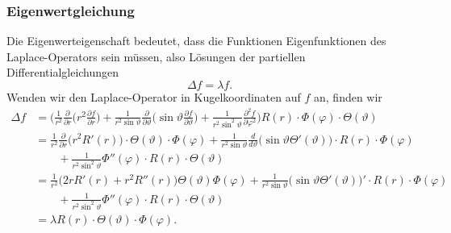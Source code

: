 \subsubsection{Eigenwertgleichung}
Die Eigenwerteigenschaft bedeutet, dass die Funktionen Eigenfunktionen
des Laplace-Operators sein müssen, also Lösungen der partiellen
Differentialgleichungen
\[
\Delta f = \lambda f.
\]
Wenden wir den Laplace-Operator in Kugelkoordinaten auf $f$ an, finden
wir
\begin{align*}
\Delta f
&=
\biggl(
\frac{1}{r^2} \frac{\partial}{\partial r}
\biggl(r^2\frac{\partial f}{\partial r}\biggr)
+
\frac1{r^2\sin\vartheta}\frac{\partial}{\partial\vartheta}
\biggl(\sin\vartheta\frac{\partial f}{\partial\vartheta}\biggr)
+
\frac1{r^2\sin^2\vartheta}\frac{\partial^2 f}{\partial\varphi^2}
\biggr)
R(r)\cdot \Phi(\varphi)\cdot \Theta(\vartheta)
\\
&=
\frac1{r^2}\frac{\partial}{\partial r}\bigl(r^2R'(r)\bigr)
\cdot \Theta(\vartheta)\cdot \Phi(\varphi)
+
\frac1{r^2\sin\vartheta}\frac{d}{d\vartheta}
\bigl(\sin\vartheta \Theta'(\vartheta)\bigr)
\cdot R(r)\cdot \Phi(\varphi)
\\
&\qquad
+
\frac1{r^2\sin^2\vartheta}\Phi''(\varphi)
\cdot R(r)\cdot \Theta(\vartheta)
\\
&=
\frac1{r^2}\bigl(2rR'(r)+r^2R''(r)\bigr)
\Theta(\vartheta)\Phi(\varphi)
+
\frac1{r^2\sin\vartheta}
\bigl(\sin\vartheta\Theta'(\vartheta)\bigr)'
\cdot R(r)\cdot\Phi(\varphi)
\\
&\qquad
+
\frac1{r^2\sin^2\vartheta}
\Phi''(\varphi)
\cdot R(r)\cdot \Theta(\vartheta)
\\
&=
\lambda
R(r)\cdot \Theta(\vartheta)\cdot \Phi(\varphi).
\end{align*}

